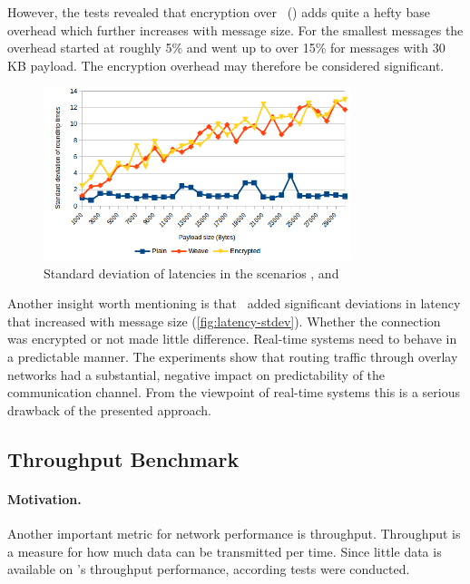 However, the tests revealed that encryption over \wnet\ () adds quite a hefty base overhead which further increases with message size. For the smallest messages the overhead started at roughly 5\% and went up to over 15\% for messages with 30 KB payload. The encryption overhead may therefore be considered significant.

\begin{figure}[htpb]
  \centering
  \includegraphics[width=0.8\textwidth]{figures/latency-stdev}
  \caption[Latency deviation]{Standard deviation of latencies in the scenarios ,  and }\label{fig:latency-stdev}
\end{figure}

Another insight worth mentioning is that \wnet\ added significant deviations in latency that increased with message size (\cf \autoref{fig:latency-stdev}). Whether the connection was encrypted or not made little difference. Real-time systems need to behave in a predictable manner. The experiments show that routing traffic through overlay networks had a substantial, negative impact on predictability of the communication channel. From the viewpoint of real-time systems this is a serious drawback of the presented approach. 



%
%
%
%
%
%
%
%
%
%

\subsection{Throughput Benchmark} \label{sec:throughput}

\paragraph{Motivation.} Another important metric for network performance is throughput. Throughput is a measure for how much data can be transmitted per time. Since little data is available on \wnet 's throughput performance, according tests were conducted.


